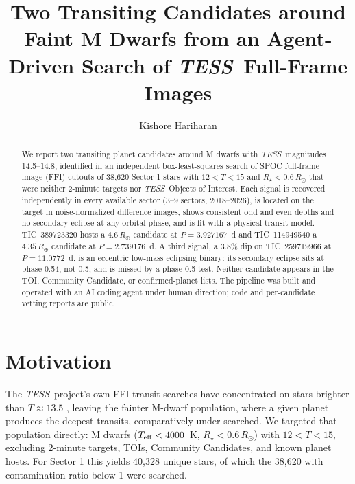 \documentclass[RNAAS]{aastex631}
\newcommand{\tess}{\textit{TESS}}
\begin{document}
\title{Two Transiting Candidates around Faint M Dwarfs from an Agent-Driven Search of \tess\ Full-Frame Images}

\author{Kishore Hariharan}


\begin{abstract}
We report two transiting planet candidates around M dwarfs with \tess\ magnitudes 14.5--14.8, identified in an independent box-least-squares search of SPOC full-frame image (FFI) cutouts of 38,620 Sector 1 stars with $12<T<15$ and $R_\star<0.6\,R_\odot$ that were neither 2-minute targets nor \tess\ Objects of Interest. Each signal is recovered independently in every available sector (3--9 sectors, 2018--2026), is located on the target in noise-normalized difference images, shows consistent odd and even depths and no secondary eclipse at any orbital phase, and is fit with a physical transit model. TIC~389723320 hosts a $4.6\,R_\oplus$ candidate at $P=3.927167$~d and TIC~114949540 a $4.35\,R_\oplus$ candidate at $P=2.739176$~d. A third signal, a 3.8\% dip on TIC~259719966 at $P=11.0772$~d, is an eccentric low-mass eclipsing binary: its secondary eclipse sits at phase 0.54, not 0.5, and is missed by a phase-0.5 test. Neither candidate appears in the TOI, Community Candidate, or confirmed-planet lists. The pipeline was built and operated with an AI coding agent under human direction; code and per-candidate vetting reports are public.
\end{abstract}

\section{Motivation}
The \tess\ project's own FFI transit searches have concentrated on stars brighter than $T\approx13.5$ \citep{huang2020,kunimoto2022}, leaving the fainter M-dwarf population, where a given planet produces the deepest transits, comparatively under-searched. We targeted that population directly: M dwarfs ($T_{\rm eff}<4000$~K, $R_\star<0.6\,R_\odot$) with $12<T<15$, excluding 2-minute targets, TOIs, Community Candidates, and known planet hosts. For Sector 1 this yields 40,328 unique stars, of which the 38,620 with contamination ratio below 1 were searched.
\end{document}
